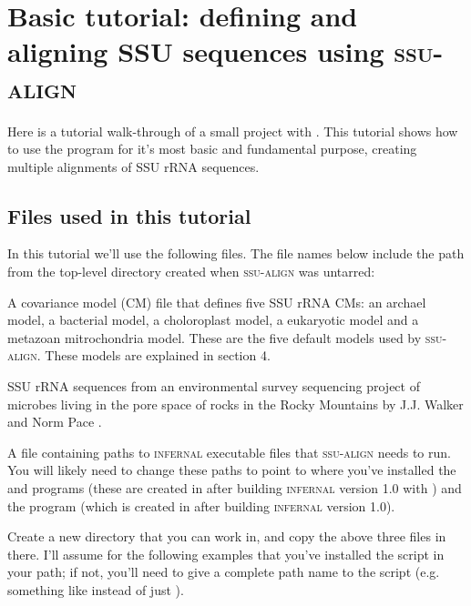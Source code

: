 \section{Basic tutorial: defining and aligning SSU sequences using \textsc{ssu-align}}

Here is a tutorial walk-through of a small project with
. This tutorial shows how to use the program for
it's most basic and fundamental purpose, creating multiple
alignments of SSU rRNA sequences. 

\subsection{Files used in this tutorial}

In this tutorial we'll use the following files. The file names below
include the path from the top-level  directory
created when \textsc{ssu-align} was untarred:

  \begin{sreitems}{}
  \item[\prog{./seeds/ssu5-0p1.cm}] A covariance model (CM) file that
    defines five SSU rRNA CMs: an archael model, a bacterial model, a
    choloroplast model, a eukaryotic model and a metazoan
    mitrochondria model. These are the five default models used by
    \textsc{ssu-align}. These models are explained in section 4.
  \item[\prog{tutorial/rocks.fa}] SSU rRNA sequences from an environmental
    survey sequencing project of microbes living in the pore space of
    rocks in the Rocky Mountains by J.J. Walker and Norm Pace
    \cite{Walker07}. 
  \item[\prog{./sa-0p1.params}] A file containing paths to
    \textsc{infernal} executable files that \textsc{ssu-align} needs
    to run. You will likely need to change these paths to point to
    where you've installed the  and 
    programs (these are created in  after building
    \textsc{infernal} version 1.0 with ) and
    the  program (which is created in
     after building \textsc{infernal}
    version 1.0).
  \end{sreitems}

Create a new directory that you can work in, and copy the above three
files in there. I'll assume for the following examples that you've
installed the  script in your path; if not, you'll
need to give a complete path name to the script (e.g. something like
\newline
{} 
instead of just ).

